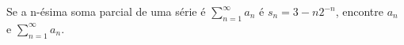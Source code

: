\item\label{5}
Se a n-ésima soma parcial de uma série é $\sum_{n=1}^{\infty} a_n$ é $s_n = 3 - n2^{-n}$, encontre $a_n$ e  $\sum_{n=1}^{\infty} a_n $.
